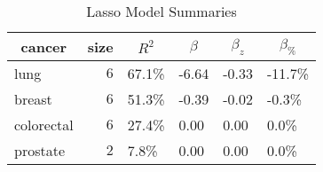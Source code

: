 %
\begin{table}[!tbp]
\caption{Lasso Model Summaries\label{tab:lasso}} 
\begin{center}
\begin{tabular}{lrllll}
\hline\hline
\multicolumn{1}{c}{cancer}&\multicolumn{1}{c}{size}&\multicolumn{1}{c}{$R^2$}&\multicolumn{1}{c}{$\beta$}&\multicolumn{1}{c}{$\beta_z$}&\multicolumn{1}{c}{$\beta_{\%}$}\tabularnewline
\hline
lung&$6$&67.1\%&-6.64&-0.33&-11.7\%\tabularnewline
breast&$6$&51.3\%&-0.39&-0.02&-0.3\%\tabularnewline
colorectal&$6$&27.4\%&0.00&0.00&0.0\%\tabularnewline
prostate&$2$&7.8\%&0.00&0.00&0.0\%\tabularnewline
\hline
\end{tabular}
\end{center}
\end{table}

